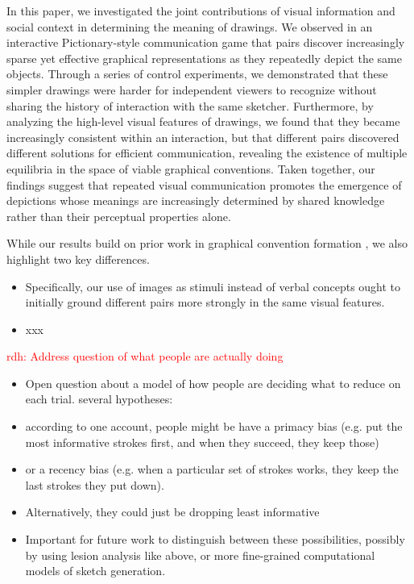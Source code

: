 \documentclass[10pt,letterpaper]{article}
\newcommand{\rdh}[1]{\textcolor{Red}{rdh: #1}}
\begin{document}
In this paper, we investigated the joint contributions of visual information and social context in determining the meaning of drawings.
We observed in an interactive Pictionary-style communication game that pairs discover increasingly sparse yet effective graphical representations as they repeatedly depict the same objects.
Through a series of control experiments, we demonstrated that these simpler drawings were harder for independent viewers to recognize without sharing the history of interaction with the same sketcher.
Furthermore, by analyzing the high-level visual features of drawings, we found that they became increasingly consistent within an interaction, but that different pairs discovered different solutions for efficient communication, revealing the existence of multiple equilibria in the space of viable graphical conventions. 
Taken together, our findings suggest that repeated visual communication promotes the emergence of depictions whose meanings are increasingly determined by shared knowledge rather than their perceptual properties alone.

While our results build on prior work in graphical convention formation \cite{garrod_foundations_2007,fay2010interactive}, we also highlight two key differences. 
\begin{itemize}
\item Specifically, our use of images as stimuli instead of verbal concepts ought to initially ground different pairs more strongly in the same visual features.
\item xxx
\end{itemize}

\rdh{Address question of what people are actually doing}
\begin{itemize}
\item Open question about a model of how people are deciding what to reduce on each trial. several hypotheses: 
\item according to one account, people might be have a primacy bias (e.g. put the most informative strokes first, and when they succeed, they keep those) 
\item or a recency bias (e.g. when a particular set of strokes works, they keep the last strokes they put down). 
\item Alternatively, they could just be dropping least informative 
\item Important for future work to distinguish between these possibilities, possibly by using lesion analysis like above, or more fine-grained computational models of sketch generation.
\end{itemize}
\end{document}
